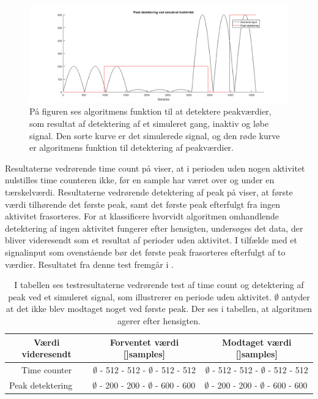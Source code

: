\begin{figure}[H]
	\centering
	\includegraphics[scale=0.3]{figures/cDesign/test_peak_inaktiv.png}
	\caption{På figuren ses algoritmens funktion til at detektere peakværdier, som resultat af detektering af et simuleret gang, inaktiv og løbe signal. Den sorte kurve er det simulerede signal, og den røde kurve er algoritmens funktion til detektering af peakværdier. }
	\label{fig:test_inaktiv_peak}
\end{figure}
Resultaterne vedrørende time count på  viser, at i perioden uden nogen aktivitet nulstilles time counteren ikke, før en sample har været over og under en tærskelværdi. Resultaterne vedrørende detektering af peak på  viser, at første værdi tilhørende det første peak, samt det første peak efterfulgt fra ingen aktivitet frasorteres. For at klassificere hvorvidt algoritmen omhandlende detektering af ingen aktivitet fungerer efter hensigten, undersøges det data, der bliver videresendt som et resultat af perioder uden aktivitet. I tilfælde med et signalinput som ovenstående bør det første peak frasorteres efterfulgt af to værdier. Resultatet fra denne test fremgår i . %
\begin{table}[H]
	\centering
	\begin{tabular}{ccc}
		\hline
		\rowcolor[HTML]{C0C0C0} 
		Værdi videresendt & Forventet værdi {[]}samples{]} & Modtaget værdi {[]}samples{]} \\ \hline
		Time counter & $\emptyset$ - 512 - 512 - $\emptyset$ - 512 - 512 & $\emptyset$ - 512 - 512 - $\emptyset$ - 512 - 512 \\ \hline
		\multicolumn{1}{l}{Peak detektering} &     \multicolumn{1}{l}{$\emptyset$ - 200 - 200 - $\emptyset$ - 600 - 600}     &     \multicolumn{1}{l}{$\emptyset$ - 200 - 200 - $\emptyset$ - 600 - 600} \\ \hline
	\end{tabular}
	\caption{I tabellen ses testresultaterne vedrørende test af time count og detektering af peak ved et simuleret signal, som illustrerer en periode uden aktivitet. $\emptyset$ antyder at det ikke blev modtaget noget ved første peak. Der ses i tabellen, at algoritmen agerer efter hensigten.}
	\label{tab:test_inaktiv}
\end{table}\vspace{-0.5cm}
